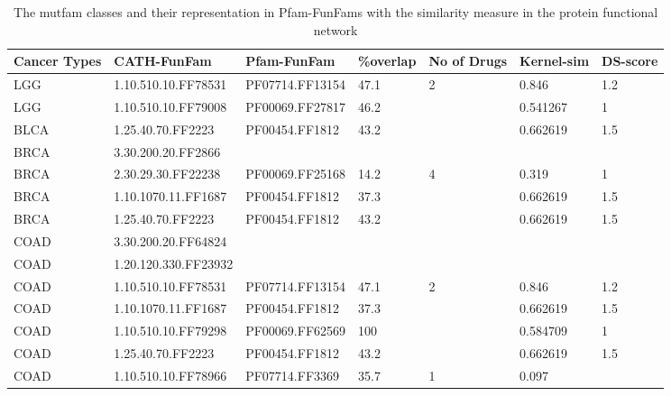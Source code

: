 \documentclass[a4paper, 11pt]{article}
\begin{document}
\begin{table}[!htbp]
\fontsize{9}{10}\selectfont
\centering
\caption{The mutfam classes and their representation in Pfam-FunFams with the  similarity measure in the protein functional network}
\label{mutfam-table}
\begin{tabular}{|l|l|l|l|l|l|l|}
\hline
Cancer Types & CATH-FunFam          & Pfam-FunFam     & \%overlap & No of Drugs & Kernel-sim & DS-score \\ \hline
LGG          & 1.10.510.10.FF78531  & PF07714.FF13154 & 47.1      & 2           & 0.846             & 1.2      \\ \hline
LGG          & 1.10.510.10.FF79008  & PF00069.FF27817 & 46.2      &             & 0.541267          & 1        \\ \hline
BLCA         & 1.25.40.70.FF2223    & PF00454.FF1812  & 43.2      &             & 0.662619          & 1.5      \\ \hline
BRCA         & 3.30.200.20.FF2866   &                 &           &             &                   &          \\ \hline
BRCA         & 2.30.29.30.FF22238   & PF00069.FF25168 & 14.2      & 4           & 0.319             & 1        \\ \hline
BRCA         & 1.10.1070.11.FF1687  & PF00454.FF1812  & 37.3      &             & 0.662619          & 1.5      \\ \hline
BRCA         & 1.25.40.70.FF2223    & PF00454.FF1812  & 43.2      &             & 0.662619          & 1.5      \\ \hline
COAD         & 3.30.200.20.FF64824  &                 &           &             &                   &          \\ \hline
COAD         & 1.20.120.330.FF23932 &                 &           &             &                   &          \\ \hline
COAD         & 1.10.510.10.FF78531  & PF07714.FF13154 & 47.1      & 2           & 0.846             & 1.2      \\ \hline
COAD         & 1.10.1070.11.FF1687  & PF00454.FF1812  & 37.3      &             & 0.662619          & 1.5      \\ \hline
COAD         & 1.10.510.10.FF79298  & PF00069.FF62569 & 100       &             & 0.584709          & 1        \\ \hline
COAD         & 1.25.40.70.FF2223    & PF00454.FF1812  & 43.2      &             & 0.662619          & 1.5      \\ \hline
COAD         & 1.10.510.10.FF78966  & PF07714.FF3369  & 35.7      & 1           & 0.097             &          \\ \hline

\end{tabular}
\end{table}
\end{document}

